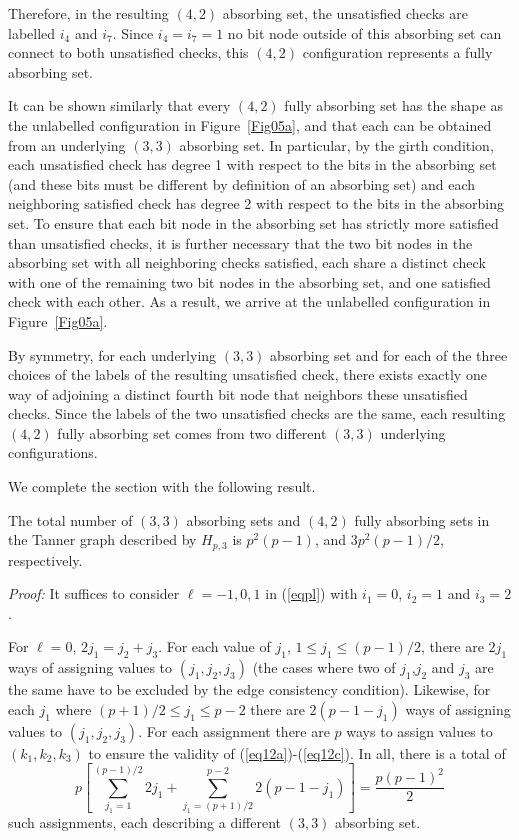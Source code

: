 Therefore, in the resulting $(4,2)$ absorbing set, the unsatisfied
checks are labelled $i_4$ and $i_7$. Since $i_4=i_7=1$ no bit node
outside of this absorbing set can connect to both unsatisfied
checks, this $(4,2)$ configuration represents a fully absorbing
set.


It can be shown similarly that every $(4,2)$ fully absorbing set
has the shape as the unlabelled configuration in
Figure~\ref{Fig05a}, and that each can be obtained from an
underlying $(3,3)$ absorbing set. In particular, by the girth
condition, each unsatisfied check has degree 1 with respect to the
bits in the absorbing set (and these bits must be different by
definition of an absorbing set) and each neighboring satisfied
check has degree 2 with respect to the bits in the absorbing set.
To ensure that each bit node in the absorbing set has strictly
more satisfied than unsatisfied checks, it is further necessary
that the two bit nodes in the absorbing set with all neighboring
checks satisfied, each share a distinct check with one of the
remaining two bit nodes in the absorbing set, and one satisfied
check with each other. As a result, we arrive at the unlabelled
configuration in Figure~\ref{Fig05a}.


By symmetry, for each underlying $(3,3)$ absorbing set and for
each of the three choices of the labels of the resulting
unsatisfied check, there exists exactly one way of adjoining a
distinct fourth bit node that neighbors these unsatisfied checks.
Since the labels of the two unsatisfied checks are the same, each
resulting $(4,2)$ fully absorbing set comes from two different
$(3,3)$ underlying configurations.

 We complete the section with the following result.
\begin{lemma}\label{le11} The total number of $(3,3)$ absorbing sets and $(4,2)$ fully absorbing sets
in the Tanner graph described by $H_{p,3}$ is $p^2(p-1)$, and
$3p^2(p-1)/2$, respectively.
\end{lemma}
\noindent \textit{Proof:} It suffices to consider $\ell=-1,0,1$ in
(\ref{eqpl}) with $i_1=0$, $i_2=1$ and $i_3=2$.

For $\ell=0$, $2j_1=j_2+j_3$. For each value of $j_1$, $1 \leq j_1
\leq (p-1)/2$, there are $2j_1$ ways of assigning values to
$(j_1,j_2,j_3)$ (the cases where two of $j_1$,$j_2$ and $j_3$ are
the same have to be excluded by the edge consistency condition).
Likewise, for each $j_1$ where $(p+1)/2 \leq j_1 \leq p-2$ there
are $2(p-1-j_1)$ ways of assigning values to $(j_1,j_2,j_3)$. For
each assignment there are $p$ ways to assign values to
$(k_1,k_2,k_3)$ to ensure the validity of
(\ref{eq12a})-(\ref{eq12c}). In all, there is a total of
\[p\left[\sum_{j_1=1}^{(p-1)/2} 2j_1 + \sum_{j_1=(p+1)/2}^{p-2}
2(p-1-j_1)\right] = \frac{p(p-1)^2}{2}\] such assignments, each
describing a different $(3,3)$ absorbing set.

